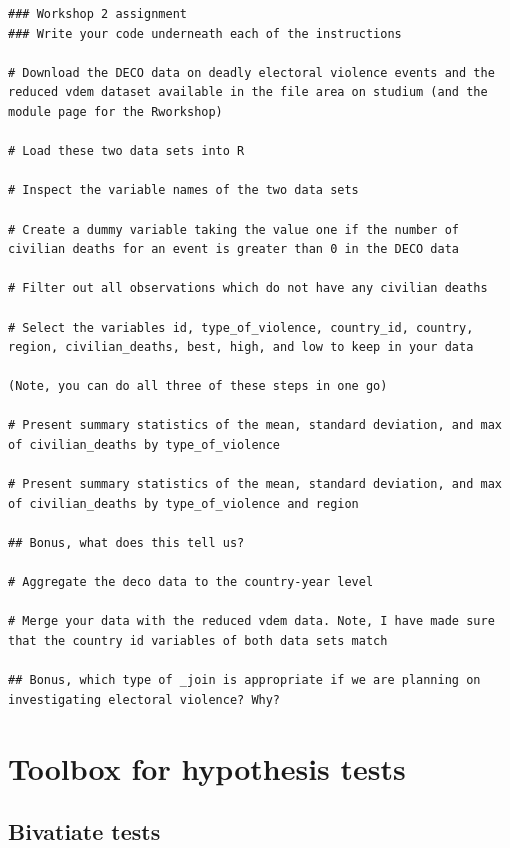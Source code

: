 \documentclass[
]{book}
\begin{document}
\begin{verbatim}
### Workshop 2 assignment
### Write your code underneath each of the instructions

# Download the DECO data on deadly electoral violence events and the reduced vdem dataset available in the file area on studium (and the module page for the Rworkshop)

# Load these two data sets into R

# Inspect the variable names of the two data sets

# Create a dummy variable taking the value one if the number of civilian deaths for an event is greater than 0 in the DECO data

# Filter out all observations which do not have any civilian deaths

# Select the variables id, type_of_violence, country_id, country, region, civilian_deaths, best, high, and low to keep in your data

(Note, you can do all three of these steps in one go)

# Present summary statistics of the mean, standard deviation, and max of civilian_deaths by type_of_violence

# Present summary statistics of the mean, standard deviation, and max of civilian_deaths by type_of_violence and region

## Bonus, what does this tell us?

# Aggregate the deco data to the country-year level

# Merge your data with the reduced vdem data. Note, I have made sure that the country id variables of both data sets match

## Bonus, which type of _join is appropriate if we are planning on investigating electoral violence? Why?
\end{verbatim}

\hypertarget{part-toolbox-for-hypothesis-tests}{%
\part{Toolbox for hypothesis tests}\label{part-toolbox-for-hypothesis-tests}}

\hypertarget{bivatiate-tests}{%
\chapter*{Bivatiate tests}\label{bivatiate-tests}}
\end{document}
